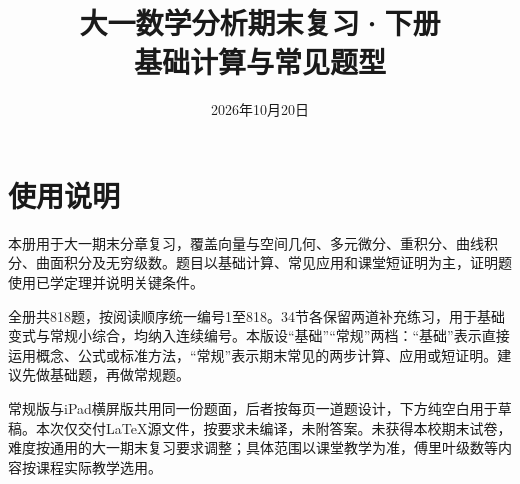 \documentclass[11pt,a4paper,fontset=fandol]{ctexart}
\title{大一数学分析期末复习·下册\\[0.4em]\large 基础计算与常见题型}
\author{}
\date{2026年10月20日}
\begin{document}
\maketitle
\section*{使用说明}
本册用于大一期末分章复习，覆盖向量与空间几何、多元微分、重积分、曲线积分、曲面积分及无穷级数。题目以基础计算、常见应用和课堂短证明为主，证明题使用已学定理并说明关键条件。

全册共818题，按阅读顺序统一编号1至818。34节各保留两道补充练习，用于基础变式与常规小综合，均纳入连续编号。本版设“基础”“常规”两档：“基础”表示直接运用概念、公式或标准方法，“常规”表示期末常见的两步计算、应用或短证明。建议先做基础题，再做常规题。

常规版与iPad横屏版共用同一份题面，后者按每页一道题设计，下方纯空白用于草稿。本次仅交付LaTeX源文件，按要求未编译，未附答案。未获得本校期末试卷，难度按通用的大一期末复习要求调整；具体范围以课堂教学为准，傅里叶级数等内容按课程实际教学选用。
\tableofcontents
\clearpage

\clearpage

\clearpage

\clearpage

\clearpage

\clearpage

\end{document}
